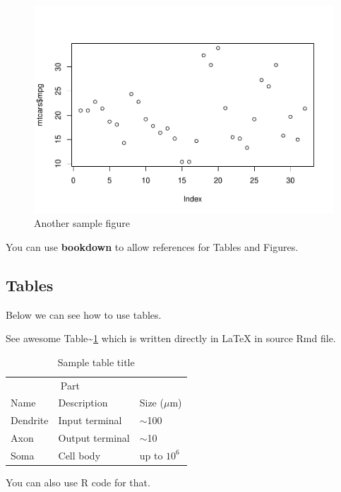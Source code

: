 \documentclass{article}
\begin{document}
\begin{figure}
\centering
\includegraphics{210431461_CSC8639_Dissertation_files/figure-latex/fig2-1.pdf}
\caption{Another sample figure}
\end{figure}

You can use \textbf{bookdown} to allow references for Tables and
Figures.

\hypertarget{tables}{%
\subsection{Tables}\label{tables}}

Below we can see how to use tables.

See awesome Table\textasciitilde{}\ref{tab:table} which is written
directly in LaTeX in source Rmd file.

\begin{table}
 \caption{Sample table title}
  \centering
  \begin{tabular}{lll}
    \toprule
    \multicolumn{2}{c}{Part}                   \\
    \cmidrule(r){1-2}
    Name     & Description     & Size ($\mu$m) \\
    \midrule
    Dendrite & Input terminal  & $\sim$100     \\
    Axon     & Output terminal & $\sim$10      \\
    Soma     & Cell body       & up to $10^6$  \\
    \bottomrule
  \end{tabular}
  \label{tab:table}
\end{table}

You can also use R code for that.
\end{document}
